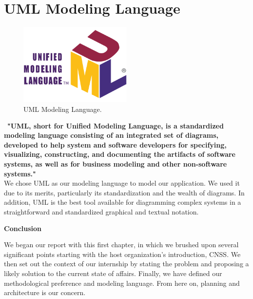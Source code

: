 \section{UML Modeling Language}
\begin{figure}[htbp]
    \centering
    \includegraphics[width=0.5\textwidth]{figures/UML_logo.png} 
    \caption{UML Modeling Language.}
\end{figure} \ 
\textbf{"UML, short for Unified Modeling Language, is a standardized modeling language consisting of an integrated set of diagrams, developed to help system and software developers for specifying, visualizing, constructing, and documenting the artifacts of software systems, as well as for business modeling and other non-software systems." \cite{samplewebs3}}\\
We chose UML as our modeling language to model our application. We used it due to its merits, particularly its standardization and the wealth of diagrams.
In addition, UML is the best tool available for diagramming complex systems in a straightforward and standardized graphical and textual notation.
\newpage
\begin{center}
    \doublespacing 
    \centering
    \LARGE\textbf{Conclusion} 
    \vspace{1cm} \\
    \raggedright
\end{center}
We began our report with this first chapter, in which we brushed upon several significant points starting with the host organization's introduction, CNSS.
\vspace{0.5cm}
We then set out the context of our internship by stating the problem and proposing a likely solution to the current state of affairs.
\vspace{0.5cm}
Finally, we have defined our methodological preference and modeling language. From here on, planning and architecture is our concern.